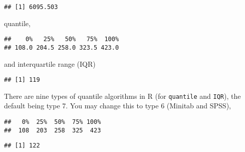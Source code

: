 \documentclass[]{book}
\newenvironment{Shaded}{\begin{snugshade}}{\end{snugshade}}
\newcommand{\KeywordTok}[1]{\textcolor[rgb]{0.13,0.29,0.53}{\textbf{{#1}}}}
\newcommand{\DataTypeTok}[1]{\textcolor[rgb]{0.13,0.29,0.53}{{#1}}}
\newcommand{\DecValTok}[1]{\textcolor[rgb]{0.00,0.00,0.81}{{#1}}}
\newcommand{\NormalTok}[1]{{#1}}
\theoremstyle{definition}
\theoremstyle{definition}
\theoremstyle{remark}
\begin{document}
\begin{verbatim}
## [1] 6095.503
\end{verbatim}

quantile,

\begin{Shaded}
\end{Shaded}

\begin{verbatim}
##    0%   25%   50%   75%  100% 
## 108.0 204.5 258.0 323.5 423.0
\end{verbatim}

and interquartile range (IQR)

\begin{Shaded}
\end{Shaded}

\begin{verbatim}
## [1] 119
\end{verbatim}

There are nine types of quantile algorithms in R (for \texttt{quantile}
and \texttt{IQR}), the default being type 7. You may change this to type
6 (Minitab and SPSS),

\begin{Shaded}
\end{Shaded}

\begin{verbatim}
##   0%  25%  50%  75% 100% 
##  108  203  258  325  423
\end{verbatim}

\begin{Shaded}
\end{Shaded}

\begin{verbatim}
## [1] 122
\end{verbatim}
\end{document}

